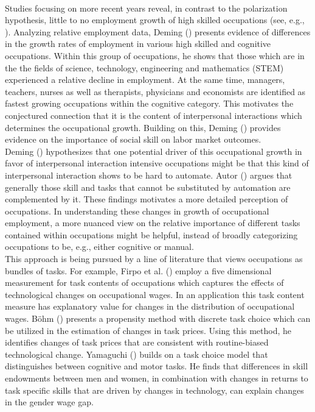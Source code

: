 \documentclass[../main.tex]{subfiles}
\begin{document}
\\
Studies focusing on more recent years reveal, in contrast to the polarization hypothesis, little to no employment growth of high skilled occupations (see, e.g., \cite{beaudry2016great}). Analyzing relative employment data, Deming (\citeyear{deming2017growing}) presents evidence of differences in the growth rates of employment in various high skilled and cognitive occupations. Within this group of occupations, he shows that those which are in the the fields of science, technology, engineering and mathematics (STEM) experienced a relative decline in employment. At the same time, managers, teachers, nurses as well as therapists, physicians and economists are identified as fastest growing occupations within the cognitive category. This motivates the conjectured connection that it is the content of interpersonal interactions which determines the occupational growth. Building on this, Deming (\citeyear{deming2017growing}) provides evidence on the importance of social skill on labor market outcomes.
\\
Deming (\citeyear{deming2017growing}) hypothesizes that one potential driver of this occupational growth in favor of interpersonal interaction intensive occupations might be that this kind of interpersonal interaction shows to be hard to automate. Autor (\citeyear{autor2015there}) argues that generally those skill and tasks that cannot be substituted by automation are complemented by it. These findings motivates a more detailed perception of occupations. In understanding these changes in growth of occupational employment, a more nuanced view on the relative importance of different tasks contained within occupations might be helpful, instead of broadly categorizing occupations to be, e.g., either cognitive or manual.
\\
This approach is being pursued by a line of literature that views occupations as bundles of tasks. For example, Firpo et al. (\citeyear{firpo2011occupational}) employ a five dimensional measurement for task contents of occupations which captures the effects of technological changes on occupational wages. In an application this task content measure has explanatory value for changes in the distribution of occupational wages. Böhm (\citeyear{bohm2019price}) presents a propensity method with discrete task choice which can be utilized in the estimation of changes in task prices. Using this method, he identifies changes of task prices that are consistent with routine-biased technological change. Yamaguchi (\citeyear{yamaguchi2018changes}) builds on a task choice model that distinguishes between cognitive and motor tasks. He finds that differences in skill endowments between men and women, in combination with changes in returns to task specific skills that are driven by changes in technology, can explain changes in the gender wage gap.
\end{document}
